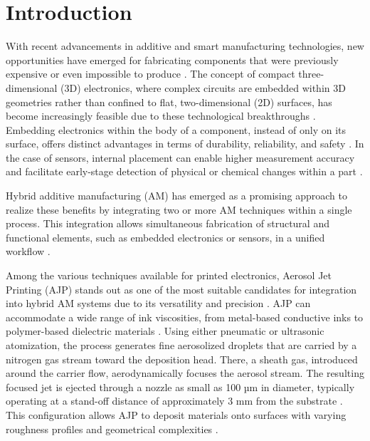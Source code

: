 \documentclass[subscriptcorrection,upint,varvw,balance,hyphenate]{asmejour}
\newcommand{\savesectionspace}{\vspace{-1mm}}
\begin{document}
\maketitle

\savesectionspace
\section{Introduction}
With recent advancements in additive and smart manufacturing technologies, new opportunities have emerged for fabricating components that were previously expensive or even impossible to produce \cite{ngo2018additive}. The concept of compact three-dimensional (3D) electronics, where complex circuits are embedded within 3D geometries rather than confined to flat, two-dimensional (2D) surfaces, has become increasingly feasible due to these technological breakthroughs \cite{goh20213d,li2019hybrid,child2025printegrated}. Embedding electronics within the body of a component, instead of only on its surface, offers distinct advantages in terms of durability, reliability, and safety \cite{maalderink20183d}. In the case of sensors, internal placement can enable higher measurement accuracy and facilitate early-stage detection of physical or chemical changes within a part \cite{dijkshoorn2018embedded,hassan20233d}.


Hybrid additive manufacturing (AM) has emerged as a promising approach to realize these benefits by integrating two or more AM techniques within a single process. This integration allows simultaneous fabrication of structural and functional elements, such as embedded electronics or sensors, in a unified workflow \cite{li2019hybrid}.

Among the various techniques available for printed electronics, Aerosol Jet Printing (AJP) stands out as one of the most suitable candidates for integration into hybrid AM systems due to its versatility and precision \cite{wilkinson2019review}. AJP can accommodate a wide range of ink viscosities, from metal-based conductive inks to polymer-based dielectric materials \cite{secor2018principles,rodriguez2012dielectric}. Using either pneumatic or ultrasonic atomization, the process generates fine aerosolized droplets that are carried by a nitrogen gas stream toward the deposition head. There, a sheath gas, introduced around the carrier flow, aerodynamically focuses the aerosol stream. The resulting focused jet is ejected through a nozzle as small as 100 µm in diameter, typically operating at a stand-off distance of approximately 3 mm from the substrate \cite{secor2018principles,jeong2023optimization,secor2025additive,gohel2025direct}. This configuration allows AJP to deposit materials onto surfaces with varying roughness profiles and geometrical complexities \cite{arabpoor2025experimental}.
\end{document}
